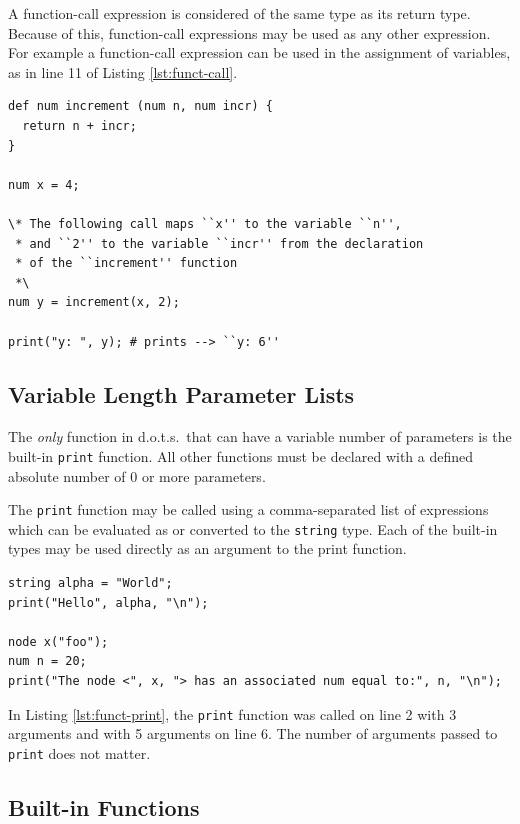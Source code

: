 \documentclass{article}
\newcommand{\pltlang}{d.o.t.s.} %
\newcommand{\code}[1]{\texttt{#1}} %
\begin{document}
A function-call expression is considered of the same type as its return type. Because of this, function-call expressions may be used as any other expression. For example a function-call expression can be used in the assignment of variables, as in line 11 of Listing \ref{lst:funct-call}.

\begin{lstlisting}[language=pltLang, caption=Function declaration and definition., label=lst:funct-call]
def num increment (num n, num incr) {
  return n + incr;
}

num x = 4;

\* The following call maps ``x'' to the variable ``n'',
 * and ``2'' to the variable ``incr'' from the declaration
 * of the ``increment'' function 
 *\
num y = increment(x, 2);

print("y: ", y); # prints --> ``y: 6''
\end{lstlisting}

\subsection{Variable Length Parameter Lists}

The \emph{only} function in \pltlang\ that can have a variable number of parameters is the built-in \code{print} function. All other functions must be declared with a defined absolute number of 0 or more parameters. 

The \code{print} function may be called using a comma-separated list of expressions which can be evaluated as or converted to the \code{string} type. Each of the built-in types may be used directly as an argument to the print function.

\begin{lstlisting}[language=pltLang, caption=The built-in ``print'' function., label=lst:funct-print]
string alpha = "World";
print("Hello", alpha, "\n");

node x("foo");
num n = 20;
print("The node <", x, "> has an associated num equal to:", n, "\n");
\end{lstlisting}

In Listing \ref{lst:funct-print}, the \code{print} function was called on line 2 with 3 arguments and with 5 arguments on line 6. The number of arguments passed to \code{print} does not matter. 

\subsection{Built-in Functions}
\end{document}
